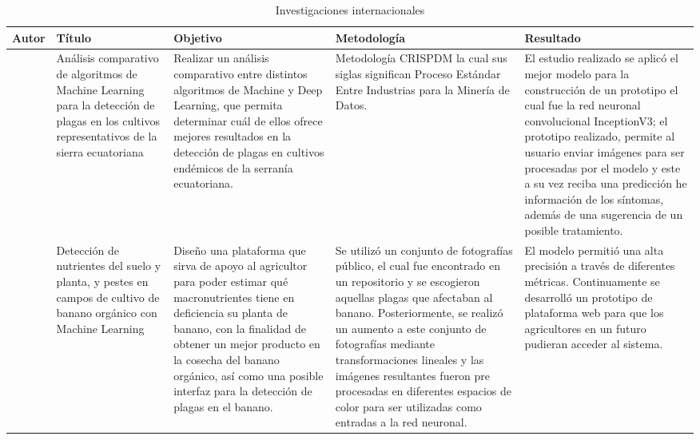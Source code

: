 \begin{longtable}{|p{2cm}|p{3cm}|p{3cm}|p{4cm}|p{3cm}|}

\caption{Investigaciones internacionales}\\
\hline
\textbf{Autor} & \textbf{Título} & \textbf{Objetivo} & \textbf{Metodología} & \textbf{Resultado} \\
\hline
\endhead

\citet{aimacana2021} & Análisis comparativo de algoritmos de Machine Learning para la detección de plagas en los cultivos representativos de la sierra ecuatoriana & Realizar un análisis comparativo entre distintos algoritmos de Machine y Deep Learning, que permita determinar cuál de ellos ofrece mejores resultados en la detección de plagas en cultivos endémicos de la serranía ecuatoriana. & Metodología CRISPDM la cual sus siglas significan Proceso Estándar Entre Industrias para la Minería de Datos. & El estudio realizado se aplicó el mejor modelo para la construcción de un prototipo el cual fue la red neuronal convolucional InceptionV3; el prototipo realizado, permite al usuario enviar imágenes para ser procesadas por el modelo y este a su vez reciba una predicción he información de los síntomas, además de una sugerencia de un posible tratamiento. \\
\hline
\citet{castaneda2021} & Detección de nutrientes del suelo y planta, y pestes en campos de cultivo de banano orgánico con Machine Learning & Diseño una plataforma que sirva de apoyo al agricultor para poder estimar qué macronutrientes tiene en deficiencia su planta de banano, con la finalidad de obtener un mejor producto en la cosecha del banano orgánico, así como una posible interfaz para la detección de plagas en el banano. & Se utilizó un conjunto de fotografías público, el cual fue encontrado en un repositorio y se escogieron aquellas plagas que afectaban al banano. Posteriormente, se realizó un aumento a este conjunto de fotografías mediante transformaciones lineales y las imágenes resultantes fueron pre procesadas en diferentes espacios de color para ser utilizadas como entradas a la red neuronal. & El modelo permitió una alta precisión a través de diferentes métricas. Continuamente se desarrolló un prototipo de plataforma web para que los agricultores en un futuro pudieran acceder al sistema. \\
\hline

\end{longtable}
